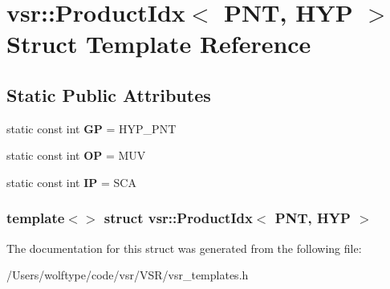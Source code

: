 \hypertarget{structvsr_1_1_product_idx_3_01_p_n_t_00_01_h_y_p_01_4}{\section{vsr\-:\-:Product\-Idx$<$ P\-N\-T, H\-Y\-P $>$ Struct Template Reference}
\label{structvsr_1_1_product_idx_3_01_p_n_t_00_01_h_y_p_01_4}
}
\subsection*{Static Public Attributes}
\begin{DoxyCompactItemize}
\item 
\hypertarget{structvsr_1_1_product_idx_3_01_p_n_t_00_01_h_y_p_01_4_ab1b64589a798b0acc9d8c949cc8aa5a9}{static const int {\bfseries G\-P} = H\-Y\-P\-\_\-\-P\-N\-T}\label{structvsr_1_1_product_idx_3_01_p_n_t_00_01_h_y_p_01_4_ab1b64589a798b0acc9d8c949cc8aa5a9}

\item 
\hypertarget{structvsr_1_1_product_idx_3_01_p_n_t_00_01_h_y_p_01_4_a0105d6aaf27d134769ad27a81756fb4c}{static const int {\bfseries O\-P} = M\-U\-V}\label{structvsr_1_1_product_idx_3_01_p_n_t_00_01_h_y_p_01_4_a0105d6aaf27d134769ad27a81756fb4c}

\item 
\hypertarget{structvsr_1_1_product_idx_3_01_p_n_t_00_01_h_y_p_01_4_ab2112c11fdfd3a721d6a2d8ef7a835f0}{static const int {\bfseries I\-P} = S\-C\-A}\label{structvsr_1_1_product_idx_3_01_p_n_t_00_01_h_y_p_01_4_ab2112c11fdfd3a721d6a2d8ef7a835f0}

\end{DoxyCompactItemize}
\subsubsection*{template$<$$>$ struct vsr\-::\-Product\-Idx$<$ P\-N\-T, H\-Y\-P $>$}



The documentation for this struct was generated from the following file\-:\begin{DoxyCompactItemize}
\item 
/\-Users/wolftype/code/vsr/\-V\-S\-R/vsr\-\_\-templates.\-h\end{DoxyCompactItemize}
